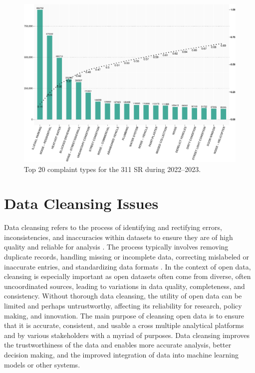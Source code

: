 \documentclass[linenumber]{jdsart}
\begin{document}
\begin{figure}[tbp]
 \centering
  \includegraphics[width = \textwidth]{SR_by_Complaint_Type-crop.pdf} 
  \caption{Top 20 complaint types for the 311 SR during 2022--2023.} 
  \label{fig:SR_complaints}
\end{figure}


\section{Data Cleansing Issues} 
\label{sec:issues}
Data cleansing refers to the process of identifying and rectifying
errors, inconsistencies, and inaccuracies within datasets to ensure
they are of high quality and reliable for analysis
\citep{maletic2005data, hosseinzadeh2023data}. The process
typically involves removing duplicate records, handling missing or
incomplete data, correcting mislabeled or inaccurate entries, and
standardizing data formats \citep[e.g.,][]{cody2017cody,
  van2018statistical}. In the context of open data, cleansing is
especially important as open datasets often come from diverse,
often uncoordinated sources, leading to variations in data quality,
completeness, and consistency. Without thorough data cleansing, 
the utility of open data can be limited and perhaps 
untrustworthy, affecting its reliability for research, 
policy making, and innovation. The main purpose of cleansing 
open data is to ensure that it is accurate, consistent, and usable a
cross multiple analytical platforms and by various stakeholders with a 
myriad of purposes. Data cleansing improves the trustworthiness 
of the data and enables more accurate analysis, 
better decision making, and the improved integration of 
data into machine learning models or other systems.
\end{document}
